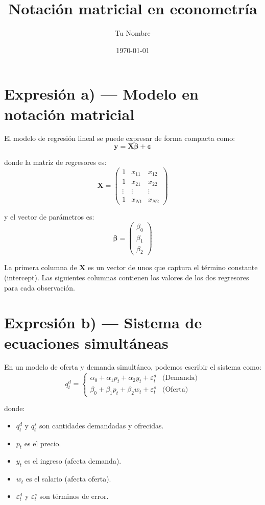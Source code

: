 \documentclass[12pt, a4paper]{article}
\title{Notación matricial en econometría}
\author{Tu Nombre}
\date{\today}
\begin{document}
\maketitle

\section{Expresión a) — Modelo en notación matricial}

El modelo de regresión lineal se puede expresar de forma compacta como:
\[
  \mathbf{y} = \mathbf{X}\boldsymbol{\beta} + \boldsymbol{\varepsilon}
\]

donde la matriz de regresores es:
\[
  \mathbf{X} = \begin{pmatrix} 1 & x_{11} & x_{12} \\ 1 & x_{21} & x_{22} \\ \vdots & \vdots & \vdots \\ 1 & x_{N1} & x_{N2} \end{pmatrix}
\]

y el vector de parámetros es:
\[
  \boldsymbol{\beta} = \begin{pmatrix} \beta_0 \\ \beta_1 \\ \beta_2 \end{pmatrix}
\]

La primera columna de $\mathbf{X}$ es un vector de unos que captura el 
término constante (intercept). Las siguientes columnas contienen los valores 
de los dos regresores para cada observación.

\section{Expresión b) — Sistema de ecuaciones simultáneas}

En un modelo de oferta y demanda simultáneo, podemos escribir el sistema como:
\[
  q_t^d = \begin{cases} 
    \alpha_0 + \alpha_1 p_t + \alpha_2 y_t + \varepsilon_t^d & \text{(Demanda)} \\ 
    \beta_0 + \beta_1 p_t + \beta_2 w_t + \varepsilon_t^s & \text{(Oferta)} 
  \end{cases}
\]

donde:
\begin{itemize}
  \item $q_t^d$ y $q_t^s$ son cantidades demandadas y ofrecidas.
  \item $p_t$ es el precio.
  \item $y_t$ es el ingreso (afecta demanda).
  \item $w_t$ es el salario (afecta oferta).
  \item $\varepsilon_t^d$ y $\varepsilon_t^s$ son términos de error.
\end{itemize}
\end{document}
